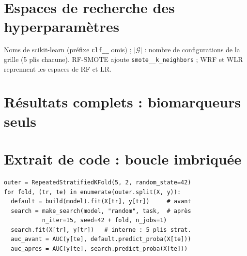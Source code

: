 \appendix
\section{Espaces de recherche des hyperparamètres}\label{app:grids}
Noms de scikit-learn (préfixe \texttt{clf\_\_} omis) ; $|\mathcal G|$ : nombre de configurations de la grille (5 plis chacune). RF-SMOTE ajoute \texttt{smote\_\_k\_neighbors} ; WRF et WLR reprennent les espaces de RF et LR.

\begin{table}[t]\centering\caption{Grilles (GridSearchCV) et distributions (RandomizedSearchCV, 30 tirages).}\label{tab:grids}

\end{table}

\section{Résultats complets : biomarqueurs seuls}\label{app:full}
\begin{table}[t]\centering\caption{AUC de test avec les seuls biomarqueurs, par défaut (Déf.), GridSearchCV (Grid) et RandomizedSearchCV (Rand.). Les autres métriques sont dans \texttt{results/holdout\_all\_metrics.csv}.}\label{tab:annex}
\scriptsize\setlength{\tabcolsep}{2.2pt}
\end{table}

\section{Extrait de code : boucle imbriquée}
{\footnotesize
\begin{verbatim}
outer = RepeatedStratifiedKFold(5, 2, random_state=42)
for fold, (tr, te) in enumerate(outer.split(X, y)):
  default = build(model).fit(X[tr], y[tr])     # avant
  search = make_search(model, "random", task,  # après
           n_iter=15, seed=42 + fold, n_jobs=1)
  search.fit(X[tr], y[tr])   # interne : 5 plis strat.
  auc_avant = AUC(y[te], default.predict_proba(X[te]))
  auc_apres = AUC(y[te], search.predict_proba(X[te]))
\end{verbatim}}
